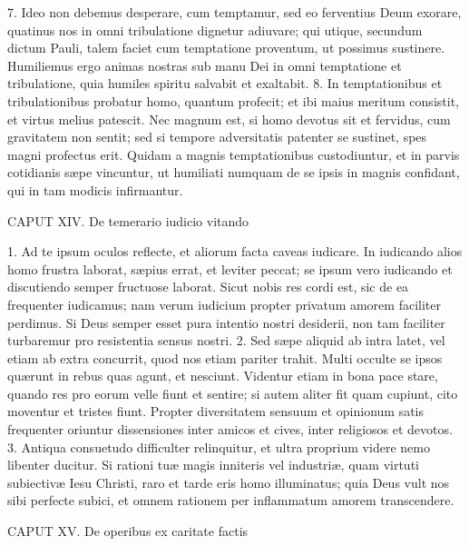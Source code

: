7. Ideo non debemus desperare, cum temptamur, sed eo ferventius Deum exorare, quatinus nos in omni tribulatione dignetur adiuvare; qui utique, secundum dictum Pauli, talem faciet cum temptatione proventum, ut possimus sustinere. Humiliemus ergo animas nostras sub manu Dei in omni temptatione et tribulatione, quia humiles spiritu salvabit et exaltabit.
8. In temptationibus et tribulationibus probatur homo, quantum profecit; et ibi maius meritum consistit, et virtus melius patescit. Nec magnum est, si homo devotus sit et fervidus, cum gravitatem non sentit; sed si tempore adversitatis patenter se sustinet, spes magni profectus erit. Quidam a magnis temptationibus custodiuntur, et in parvis cotidianis sæpe vincuntur, ut humiliati numquam de se ipsis in magnis confidant, qui in tam modicis infirmantur.


CAPUT XIV.
De temerario iudicio vitando

1. Ad te ipsum oculos reflecte, et aliorum facta caveas iudicare. In iudicando alios homo frustra laborat, sæpius errat, et leviter peccat; se ipsum vero iudicando et discutiendo semper fructuose laborat. Sicut nobis res cordi est, sic de ea frequenter iudicamus; nam verum iudicium propter privatum amorem faciliter perdimus. Si Deus semper esset pura intentio nostri desiderii, non tam faciliter turbaremur pro resistentia sensus nostri.
2. Sed sæpe aliquid ab intra latet, vel etiam ab extra concurrit, quod nos etiam pariter trahit. Multi occulte se ipsos quærunt in rebus quas agunt, et nesciunt. Videntur etiam in bona pace stare, quando res pro eorum velle fiunt et sentire; si autem aliter fit quam cupiunt, cito moventur et tristes fiunt. Propter diversitatem sensuum et opinionum satis frequenter oriuntur dissensiones inter amicos et cives, inter religiosos et devotos.
3. Antiqua consuetudo difficulter relinquitur, et ultra proprium videre nemo libenter ducitur. Si rationi tuæ magis inniteris vel industriæ, quam virtuti subiectivæ Iesu Christi, raro et tarde eris homo illuminatus; quia Deus vult nos sibi perfecte subici, et omnem rationem per inflammatum amorem transcendere.


CAPUT XV.
De operibus ex caritate factis

